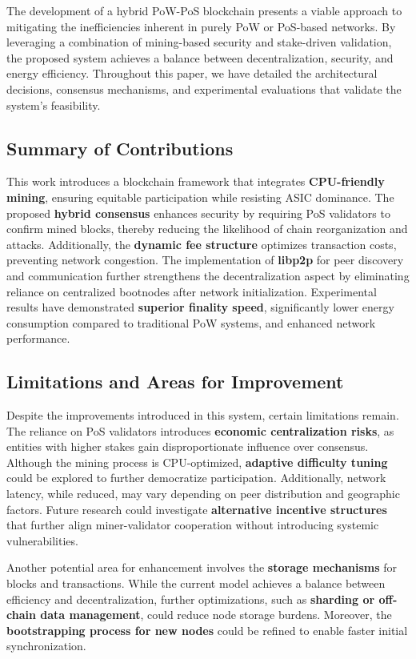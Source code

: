 \documentclass[conference]{IEEEtran}
\begin{document}
The development of a hybrid PoW-PoS blockchain presents a viable approach to mitigating the inefficiencies inherent in purely PoW or PoS-based networks. By leveraging a combination of mining-based security and stake-driven validation, the proposed system achieves a balance between decentralization, security, and energy efficiency. Throughout this paper, we have detailed the architectural decisions, consensus mechanisms, and experimental evaluations that validate the system's feasibility.

\subsection{Summary of Contributions}
This work introduces a blockchain framework that integrates \textbf{CPU-friendly mining}, ensuring equitable participation while resisting ASIC dominance. The proposed \textbf{hybrid consensus} enhances security by requiring PoS validators to confirm mined blocks, thereby reducing the likelihood of chain reorganization and attacks. Additionally, the \textbf{dynamic fee structure} optimizes transaction costs, preventing network congestion. The implementation of \textbf{libp2p} for peer discovery and communication further strengthens the decentralization aspect by eliminating reliance on centralized bootnodes after network initialization. Experimental results have demonstrated \textbf{superior finality speed}, significantly lower energy consumption compared to traditional PoW systems, and enhanced network performance.

\subsection{Limitations and Areas for Improvement}
Despite the improvements introduced in this system, certain limitations remain. The reliance on PoS validators introduces \textbf{economic centralization risks}, as entities with higher stakes gain disproportionate influence over consensus. Although the mining process is CPU-optimized, \textbf{adaptive difficulty tuning} could be explored to further democratize participation. Additionally, network latency, while reduced, may vary depending on peer distribution and geographic factors. Future research could investigate \textbf{alternative incentive structures} that further align miner-validator cooperation without introducing systemic vulnerabilities.

Another potential area for enhancement involves the \textbf{storage mechanisms} for blocks and transactions. While the current model achieves a balance between efficiency and decentralization, further optimizations, such as \textbf{sharding or off-chain data management}, could reduce node storage burdens. Moreover, the \textbf{bootstrapping process for new nodes} could be refined to enable faster initial synchronization.
\end{document}
